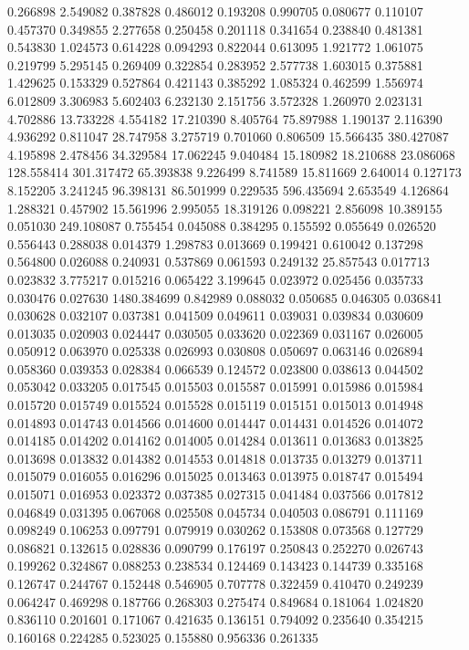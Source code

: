 0.266898
2.549082
0.387828
0.486012
0.193208
0.990705
0.080677
0.110107
0.457370
0.349855
2.277658
0.250458
0.201118
0.341654
0.238840
0.481381
0.543830
1.024573
0.614228
0.094293
0.822044
0.613095
1.921772
1.061075
0.219799
5.295145
0.269409
0.322854
0.283952
2.577738
1.603015
0.375881
1.429625
0.153329
0.527864
0.421143
0.385292
1.085324
0.462599
1.556974
6.012809
3.306983
5.602403
6.232130
2.151756
3.572328
1.260970
2.023131
4.702886
13.733228
4.554182
17.210390
8.405764
75.897988
1.190137
2.116390
4.936292
0.811047
28.747958
3.275719
0.701060
0.806509
15.566435
380.427087
4.195898
2.478456
34.329584
17.062245
9.040484
15.180982
18.210688
23.086068
128.558414
301.317472
65.393838
9.226499
8.741589
15.811669
2.640014
0.127173
8.152205
3.241245
96.398131
86.501999
0.229535
596.435694
2.653549
4.126864
1.288321
0.457902
15.561996
2.995055
18.319126
0.098221
2.856098
10.389155
0.051030
249.108087
0.755454
0.045088
0.384295
0.155592
0.055649
0.026520
0.556443
0.288038
0.014379
1.298783
0.013669
0.199421
0.610042
0.137298
0.564800
0.026088
0.240931
0.537869
0.061593
0.249132
25.857543
0.017713
0.023832
3.775217
0.015216
0.065422
3.199645
0.023972
0.025456
0.035733
0.030476
0.027630
1480.384699
0.842989
0.088032
0.050685
0.046305
0.036841
0.030628
0.032107
0.037381
0.041509
0.049611
0.039031
0.039834
0.030609
0.013035
0.020903
0.024447
0.030505
0.033620
0.022369
0.031167
0.026005
0.050912
0.063970
0.025338
0.026993
0.030808
0.050697
0.063146
0.026894
0.058360
0.039353
0.028384
0.066539
0.124572
0.023800
0.038613
0.044502
0.053042
0.033205
0.017545
0.015503
0.015587
0.015991
0.015986
0.015984
0.015720
0.015749
0.015524
0.015528
0.015119
0.015151
0.015013
0.014948
0.014893
0.014743
0.014566
0.014600
0.014447
0.014431
0.014526
0.014072
0.014185
0.014202
0.014162
0.014005
0.014284
0.013611
0.013683
0.013825
0.013698
0.013832
0.014382
0.014553
0.014818
0.013735
0.013279
0.013711
0.015079
0.016055
0.016296
0.015025
0.013463
0.013975
0.018747
0.015494
0.015071
0.016953
0.023372
0.037385
0.027315
0.041484
0.037566
0.017812
0.046849
0.031395
0.067068
0.025508
0.045734
0.040503
0.086791
0.111169
0.098249
0.106253
0.097791
0.079919
0.030262
0.153808
0.073568
0.127729
0.086821
0.132615
0.028836
0.090799
0.176197
0.250843
0.252270
0.026743
0.199262
0.324867
0.088253
0.238534
0.124469
0.143423
0.144739
0.335168
0.126747
0.244767
0.152448
0.546905
0.707778
0.322459
0.410470
0.249239
0.064247
0.469298
0.187766
0.268303
0.275474
0.849684
0.181064
1.024820
0.836110
0.201601
0.171067
0.421635
0.136151
0.794092
0.235640
0.354215
0.160168
0.224285
0.523025
0.155880
0.956336
0.261335
